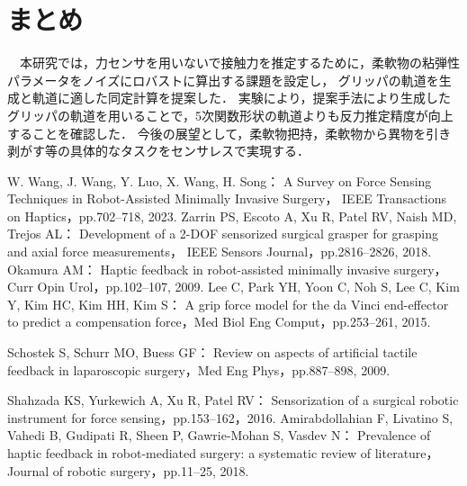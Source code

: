 \documentclass[a4paper]{jarticle}
\begin{document}
\section{まとめ}
　本研究では，力センサを用いないで接触力を推定するために，柔軟物の粘弾性パラメータをノイズにロバストに算出する課題を設定し，
グリッパの軌道を生成と軌道に適した同定計算を提案した．
実験により，提案手法により生成したグリッパの軌道を用いることで，5次関数形状の軌道よりも反力推定精度が向上することを確認した．
今後の展望として，柔軟物把持，柔軟物から異物を引き剥がす等の具体的なタスクをセンサレスで実現する．
\begin{thebibliography}{9}
    \setlength{\itemsep}{0pt} %
    \renewcommand{\baselinestretch}{0.8}\selectfont %
    \setlength{\parskip}{0pt} %

    W. Wang, J. Wang, Y. Luo, X. Wang, H. Song：
    A Survey on Force Sensing Techniques in Robot-Assisted Minimally Invasive Surgery，
    IEEE Transactions on Haptics，pp.702–718, 2023.
    Zarrin PS, Escoto A, Xu R, Patel RV, Naish MD, Trejos AL： 
    Development of a 2-DOF sensorized surgical grasper for grasping and axial force measurements，
    IEEE Sensors Journal，pp.2816–2826, 2018.
    Okamura AM：
    Haptic feedback in robot-assisted minimally invasive surgery，Curr Opin Urol，pp.102–107, 2009.
    Lee C, Park YH, Yoon C, Noh S, Lee C, Kim Y, Kim HC, Kim HH, Kim S：
    A grip force model for the da Vinci end-effector to predict a compensation force，Med Biol Eng Comput，pp.253–261, 2015.

    Schostek S, Schurr MO, Buess GF：
    Review on aspects of artificial tactile feedback in laparoscopic surgery，Med Eng Phys，pp.887–898, 2009.

    Shahzada KS, Yurkewich A, Xu R, Patel RV：
    Sensorization of a surgical robotic instrument for force sensing，pp.153–162，2016.
    Amirabdollahian F, Livatino S, Vahedi B, Gudipati R, Sheen P, Gawrie-Mohan S, Vasdev N：
    Prevalence of haptic feedback in robot-mediated surgery: a systematic review of literature，Journal of robotic surgery，pp.11–25, 2018.




\end{thebibliography}
\end{document}
